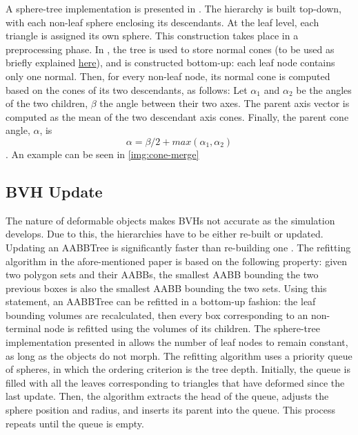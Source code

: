 A sphere-tree implementation is presented in \citep{rtsd01}. The hierarchy is built top-down, with each non-leaf sphere enclosing its descendants. At the leaf level, each triangle is assigned its own sphere. This construction takes place in a preprocessing phase. In \citep{provot97}, the tree is used to store normal cones (to be used as briefly explained \hyperref[lab:ncones]{here}), and is constructed bottom-up: each leaf node contains only one normal. Then, for every non-leaf node, its normal cone is computed based on the cones of its two descendants, as follows: Let $\alpha_{1}$ and $\alpha_{2}$ be the angles of the two children, $\beta$ the angle between their two axes. The parent axis vector is computed as the mean of the two descendant axis cones. Finally, the parent cone angle, $\alpha$, is \[\alpha = \beta / 2 + max(\alpha_{1}, \alpha_{2})\]. An example can be seen in \autoref{img:cone-merge}


\subsection{BVH Update}
\label{sub-sec:bvhupdate}

The nature of deformable objects makes BVHs not accurate as the simulation develops. Due to this, the hierarchies have to be either re-built or updated. Updating an AABBTree is significantly faster than re-building one \citep{vdb97}. The refitting algorithm in the afore-mentioned paper is based on the following property: given two polygon sets and their AABBs, the smallest AABB bounding the two previous boxes is also the smallest AABB bounding the two sets. Using this statement, an AABBTree can be refitted in a bottom-up fashion: the leaf bounding volumes are recalculated, then every box corresponding to an non-terminal node is refitted using the volumes of its children. The sphere-tree implementation presented in \citep{rtsd01} allows the number of leaf nodes to remain constant, as long as the objects do not morph. The refitting algorithm uses a priority queue of spheres, in which the ordering criterion is the tree depth. Initially, the queue is filled with all the leaves corresponding to triangles that have deformed since the last update. Then, the algorithm extracts the head of the queue, adjusts the sphere position and radius, and inserts its parent into the queue. This process repeats until the queue is empty.

